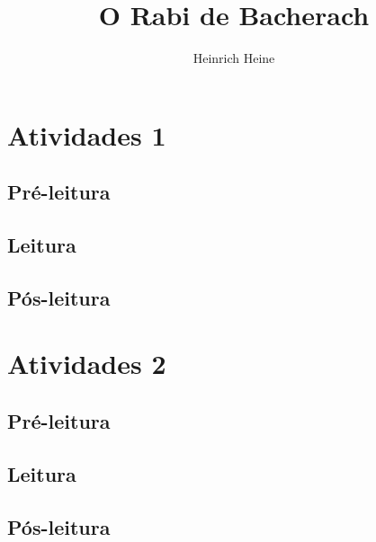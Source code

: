\documentclass{article}
\begin{document}
\newcommand{\AutorLivro}{Heinrich Heine} 
\newcommand{\TituloLivro}{O Rabi de Bacherach}
\newcommand{\Tema}{Ficção, mistério e fantasia}
\newcommand{\Genero}{Romance}
\newcommand{\imagemCapa}{PNLD0018-01.png}
\newcommand{\issnppub}{---}
\newcommand{\issnepub}{---}
\newcommand{\colaborador}{\textbf{Fulano de Tal} é uma pessoa incrível e vai fazer um bom serviço.}


\title{\TituloLivro}
\author{\AutorLivro}
\def\authornotes{\colaborador}

\date{}
\maketitle
\tableofcontents




\section{Atividades 1}


\subsection{Pré-leitura}
\subsection{Leitura}
\subsection{Pós-leitura}



\section{Atividades 2}

\subsection{Pré-leitura}
\subsection{Leitura}
\subsection{Pós-leitura}

\lipsum
\end{document}
